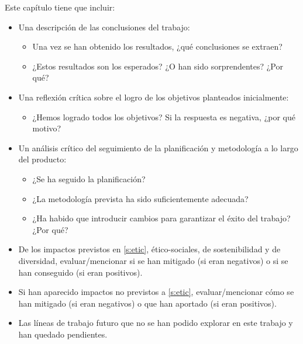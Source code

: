 \documentclass[IB]{TFUOC}%
\begin{document}
Este capítulo tiene que incluir:
\begin{itemize}
\item Una descripción de las conclusiones del trabajo:
\begin{itemize}
    \item Una vez se han obtenido los resultados, ¿qué conclusiones se extraen?
    \item ¿Estos resultados son los esperados? ¿O han sido sorprendentes? ¿Por qué? 
\end{itemize}
\item Una reflexión crítica sobre el logro de los objetivos planteados inicialmente:
\begin{itemize}
    \item ¿Hemos logrado todos los objetivos? Si la respuesta es negativa, ¿por qué motivo?
\end{itemize}
\item Un análisis crítico del seguimiento de la planificación y metodología a lo largo del producto:
\begin{itemize}
    \item ¿Se ha seguido la planificación?
    \item ¿La metodología prevista ha sido suficientemente adecuada?
    \item ¿Ha habido que introducir cambios para garantizar el éxito del trabajo? ¿Por qué? 
\end{itemize}
\item De los impactos previstos en \ref{s:etic}, ético-sociales, de sostenibilidad y de diversidad, evaluar/mencionar si se han mitigado (si eran negativos) o si se han conseguido (si eran positivos). 
\item Si han aparecido impactos no previstos a \ref{s:etic}, evaluar/mencionar cómo se han mitigado (si eran negativos) o que han aportado (si eran positivos).
\item Las líneas de trabajo futuro que no se han podido explorar en este trabajo y han quedado pendientes.


\end{itemize}
\end{document}
